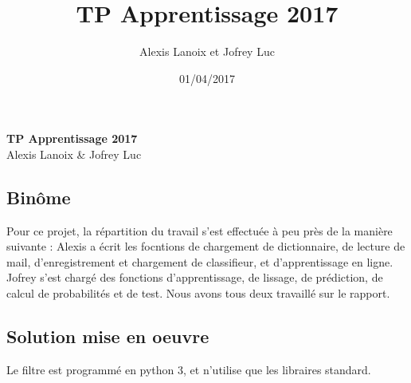 \documentclass{report}
\author{Alexis Lanoix et Jofrey Luc}
\title{TP Apprentissage 2017}
\date{01/04/2017}
\begin{document}
\vspace{2cm}
\begin{center}
  \Large\textbf{TP Apprentissage 2017}\\
  \large{Alexis Lanoix \& Jofrey Luc}
\end{center}
\vspace{1cm}

\subsection*{Binôme}

Pour ce projet, la répartition du travail s'est effectuée à peu près de la manière suivante : Alexis a écrit les focntions de chargement de dictionnaire, de lecture de mail, d'enregistrement et chargement de classifieur, et d'apprentissage en ligne. Jofrey s'est chargé des fonctions d'apprentissage, de lissage, de prédiction, de calcul de probabilités et de test. Nous avons tous deux travaillé sur le rapport.

\subsection*{Solution mise en oeuvre}

Le filtre est programmé en python 3, et n'utilise que les libraires standard.\\
\end{document}
